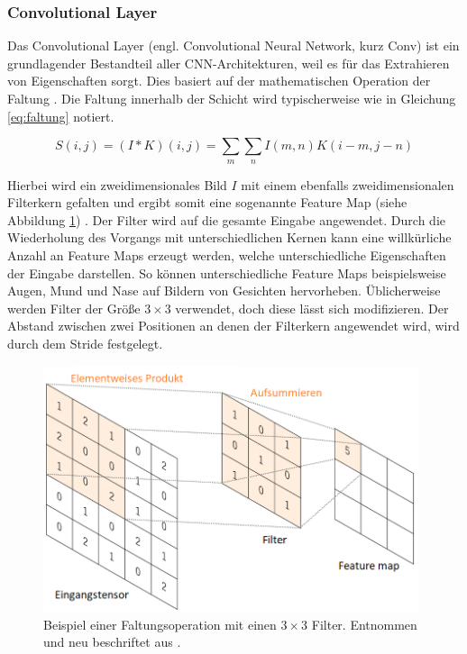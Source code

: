 \subsubsection{Convolutional Layer}
Das Convolutional Layer (engl. Convolutional Neural Network, kurz Conv) ist ein grundlagender Bestandteil aller CNN-Architekturen, weil es für das Extrahieren von Eigenschaften sorgt. Dies basiert auf der mathematischen Operation der Faltung \cite{cnns-an-overview-and-application-in-radiology}. Die Faltung innerhalb der Schicht wird typischerweise wie in Gleichung \ref{eq:faltung} notiert.

\begin{equation}\label{eq:faltung}
S(i,j)=(I*K)(i,j)=\sum_{m}\sum_{n}I(m,n)K(i-m,j-n)
\end{equation}

\mypar Hierbei wird ein zweidimensionales Bild $I$ mit einem ebenfalls zweidimensionalen Filterkern gefalten und ergibt somit eine sogenannte Feature Map (siehe Abbildung \ref{fig:convolution}) \cite{Goodfellow-et-al-2016}. Der Filter wird auf die gesamte Eingabe angewendet. Durch die Wiederholung des Vorgangs mit unterschiedlichen Kernen kann eine willkürliche Anzahl an Feature Maps erzeugt werden, welche unterschiedliche Eigenschaften der Eingabe darstellen. So können unterschiedliche Feature Maps beispielsweise Augen, Mund und Nase auf Bildern von Gesichten hervorheben. Üblicherweise werden Filter der Größe $3 \times 3$ verwendet, doch diese lässt sich modifizieren. Der Abstand zwischen zwei Positionen an denen der Filterkern angewendet wird, wird durch dem Stride festgelegt. \cite{cnns-an-overview-and-application-in-radiology}

\begin{figure}[h!]
\centering
\includegraphics[width=11cm]{98_images/convolution.png}
\caption{Beispiel einer Faltungsoperation mit einen $3 \times 3$ Filter. Entnommen und neu beschriftet aus  \cite{cnns-an-overview-and-application-in-radiology}.}
\label{fig:convolution}
\end{figure}

